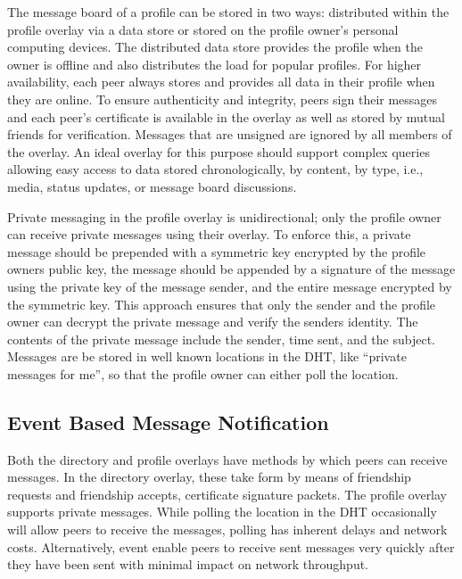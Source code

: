 The message board of a profile can be stored in two ways: distributed within
the profile overlay via a data store or stored on the profile owner's personal
computing devices.  The distributed data store provides the profile when the
owner is offline and also distributes the load for popular profiles.  For
higher availability, each peer always stores and provides all data in their
profile when they are online.  To ensure authenticity and integrity, peers sign
their messages and each peer's certificate is available in the overlay as well
as stored by mutual friends for verification.  Messages that are unsigned are
ignored by all members of the overlay.  An ideal overlay for this purpose
should support complex queries~\cite{complex_queries} allowing easy access to
data stored chronologically, by content, by type, i.e., media, status updates,
or message board discussions.

Private messaging in the profile overlay is unidirectional; only the profile
owner can receive private messages using their overlay.  To enforce this, a
private message should be prepended with a symmetric key encrypted by the
profile owners public key, the message should be appended by a signature of the
message using the private key of the message sender, and the entire message
encrypted by the symmetric key.  This approach ensures that only the sender and
the profile owner can decrypt the private message and verify the senders
identity.  The contents of the private message include the sender, time sent,
and the subject.  Messages are be stored in well known locations in the DHT,
like ``private messages for me'', so that the profile owner can either poll the
location.

\subsection{Event Based Message Notification}

Both the directory and profile overlays have methods by which peers can receive
messages.  In the directory overlay, these take form by means of friendship
requests and friendship accepts, certificate signature packets.  The profile
overlay supports private messages.  While polling the location in the DHT
occasionally will allow peers to receive the messages, polling has inherent
delays and network costs.  Alternatively, event  enable peers to receive sent
messages very quickly after they have been sent with minimal impact on network
throughput.

